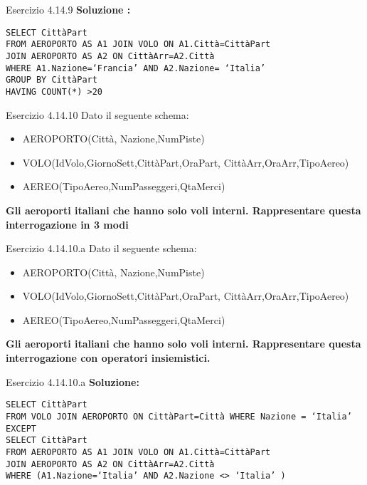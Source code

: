 \begin{frame}{Esercizio 4.14.9}
    \textbf{Soluzione :}
    \vspace{1em}
    
    \texttt{SELECT Citt\`aPart\\FROM AEROPORTO AS A1 JOIN VOLO ON A1.Citt\`a=Citt\`aPart\\JOIN AEROPORTO AS A2 ON Citt\`aArr=A2.Citt\`a\\WHERE A1.Nazione=`Francia' AND A2.Nazione= `Italia'\\GROUP BY Citt\`aPart\\HAVING COUNT(*) >20}
\end{frame}
\begin{frame}{Esercizio 4.14.10}
    Dato il seguente schema:
    \begin{itemize}
        \item AEROPORTO(Citt\`a, Nazione,NumPiste)
        \item VOLO(IdVolo,GiornoSett,Citt\`aPart,OraPart,
        Citt\`aArr,OraArr,TipoAereo)
        \item AEREO(TipoAereo,NumPasseggeri,QtaMerci)
    \end{itemize}
    \vspace{1em}
    
    \textbf{Gli aeroporti italiani che hanno solo voli interni. Rappresentare questa interrogazione in 3 modi}
\end{frame}
%
\begin{frame}{Esercizio 4.14.10.a}
    Dato il seguente schema:
    \begin{itemize}
        \item AEROPORTO(Citt\`a, Nazione,NumPiste)
        \item VOLO(IdVolo,GiornoSett,Citt\`aPart,OraPart,
        Citt\`aArr,OraArr,TipoAereo)
        \item AEREO(TipoAereo,NumPasseggeri,QtaMerci)
    \end{itemize}
    \vspace{1em}
    
    \textbf{Gli aeroporti italiani che hanno solo voli interni. Rappresentare questa interrogazione con operatori insiemistici.}
\end{frame}
\begin{frame}{Esercizio 4.14.10.a}
    \textbf{Soluzione:}
    \vspace{1em}
    
    \texttt{SELECT Citt\`aPart
    \\FROM VOLO JOIN AEROPORTO ON Citt\`aPart=Citt\`a WHERE Nazione = `Italia'
    \\EXCEPT
    \\SELECT Citt\`aPart
    \\FROM AEROPORTO AS A1 JOIN VOLO ON A1.Citt\`a=Citt\`aPart \\JOIN AEROPORTO AS A2 ON Citt\`aArr=A2.Citt\`a
    \\WHERE (A1.Nazione=`Italia' AND A2.Nazione <> `Italia' )}
\end{frame}
